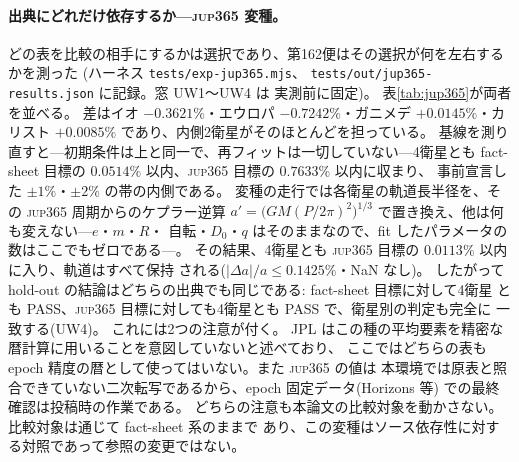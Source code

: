 \documentclass[a4paper,10pt,twocolumn]{ltjsarticle}
\begin{document}
\paragraph*{出典にどれだけ依存するか---\textsc{jup365} 変種。}
どの表を比較の相手にするかは選択であり、第162便はその選択が何を左右するかを測った
(ハーネス \texttt{tests/exp-jup365.mjs}、
\texttt{tests/out/\allowbreak jup365-\allowbreak results.json} に記録。窓 UW1〜UW4 は
実測前に固定)。
表\ref{tab:jup365}が両者を並べる。
差はイオ $-0.3621\%$・エウロパ $-0.7242\%$・ガニメデ $+0.0145\%$・カリスト
$+0.0085\%$ であり、内側2衛星がそのほとんどを担っている。
基線を測り直すと---初期条件は上と同一で、再フィットは一切していない---4衛星とも
fact-sheet 目標の $0.0514\%$ 以内、\textsc{jup365} 目標の $0.7633\%$ 以内に収まり、
事前宣言した $\pm1\%$・$\pm2\%$ の帯の内側である。
変種の走行では各衛星の軌道長半径を、その \textsc{jup365} 周期からのケプラー逆算
$a'=\bigl(GM(P/2\pi)^{2}\bigr)^{1/3}$ で置き換え、他は何も変えない---$e$・$m$・$R$・
自転・$D_0$・$q$ はそのままなので、fit したパラメータの数はここでもゼロである---。
その結果、4衛星とも \textsc{jup365} 目標の $0.0113\%$ 以内に入り、軌道はすべて保持
される($|\Delta a|/a\leq0.1425\%$・NaN なし)。
したがって hold-out の結論はどちらの出典でも同じである: fact-sheet 目標に対して4衛星
とも PASS、\textsc{jup365} 目標に対しても4衛星とも PASS で、衛星別の判定も完全に
一致する(UW4)。
これには2つの注意が付く。
JPL はこの種の平均要素を精密な暦計算に用いることを意図していないと述べており、
ここではどちらの表も epoch 精度の暦として使ってはいない。また \textsc{jup365} の値は
本環境では原表と照合できていない二次転写であるから、epoch 固定データ(Horizons 等)
での最終確認は投稿時の作業である。
どちらの注意も本論文の比較対象を動かさない。比較対象は通じて fact-sheet 系のままで
あり、この変種はソース依存性に対する対照であって参照の変更ではない。
\end{document}
